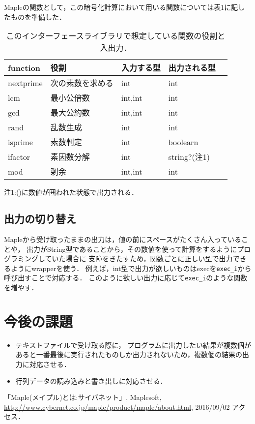\documentclass[10pt,a4j,twocolumn]{jsarticle}
\begin{document}
Mapleの関数として，この暗号化計算において用いる関数については表1に記したものを準備した．
\begin{table}[htbp]\begin{center}
\caption{このインターフェースライブラリで想定している関数の役割と入出力．}
\begin{tabular}{lllll}
\hline
function  &役割  &入力する型  &出力される型  \\ \hline
nextprime  &次の素数を求める  &int  &int  \\
lcm  &最小公倍数  &int,int  &int  \\
gcd  &最大公約数  &int,int  &int  \\
rand  &乱数生成  &int  &int  \\
isprime  &素数判定  &int  &boolearn  \\
ifactor  &素因数分解  &int  &string?(注1)  \\
mod  &剰余  &int,int  &int  \\
\hline
\end{tabular}
注1:()に数値が囲われた状態で出力される．
\label{default}
\end{center}
\end{table}

\subsection{出力の切り替え}
Mapleから受け取ったままの出力は，値の前にスペースがたくさん入っていることや，
出力がString型であることから，その数値を使って計算をするようにプログラミングしていた場合に
支障をきたすため，関数ごとに正しい型で出力できるようにwrapperを使う．
例えば，int型で出力が欲しいものはexecを\verb|exec_i|から呼び出すことで対応する．
このように欲しい出力に応じて\verb|exec_i|のような関数を増やす．

\section{今後の課題}
\begin{itemize}
\item テキストファイルで受け取る際に，
プログラムに出力したい結果が複数個があると一番最後に実行されたものしか出力されないため，複数個の結果の出力に対応させる．
\item 行列データの読み込みと書き出しに対応させる．
\end{itemize}
\begin{flushleft}
\begin{thebibliography}{9}
「Maple(メイプル)とは:サイバネット」, Maplesoft, \url{http://www.cybernet.co.jp/maple/product/maple/about.html}, 2016/09/02 アクセス．
\end{thebibliography}
\end{flushleft}
\end{document}
